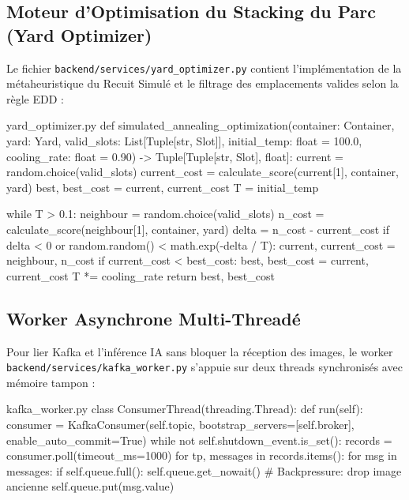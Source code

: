 \documentclass[12pt,a4paper]{article}
\begin{document}
\subsection{Moteur d'Optimisation du Stacking du Parc (Yard Optimizer)}

Le fichier \texttt{backend/services/yard\_optimizer.py} contient l’implémentation de la métaheuristique du Recuit Simulé et le filtrage des emplacements valides selon la règle EDD :

\begin{vscodeWindow}{yard\_optimizer.py}
def simulated_annealing_optimization(container: Container, yard: Yard, valid_slots: List[Tuple[str, Slot]], 
                                     initial_temp: float = 100.0, cooling_rate: float = 0.90) -> Tuple[Tuple[str, Slot], float]:
    current = random.choice(valid_slots)
    current_cost = calculate_score(current[1], container, yard)
    best, best_cost = current, current_cost
    T = initial_temp
    
    while T > 0.1:
        neighbour = random.choice(valid_slots)
        n_cost = calculate_score(neighbour[1], container, yard)
        delta = n_cost - current_cost
        if delta < 0 or random.random() < math.exp(-delta / T):
            current, current_cost = neighbour, n_cost
            if current_cost < best_cost:
                best, best_cost = current, current_cost
        T *= cooling_rate
    return best, best_cost
\end{vscodeWindow}

\subsection{Worker Asynchrone Multi-Threadé}

Pour lier Kafka et l'inférence IA sans bloquer la réception des images, le worker \texttt{backend/services/kafka\_worker.py} s'appuie sur deux threads synchronisés avec mémoire tampon :

\begin{vscodeWindow}{kafka\_worker.py}
class ConsumerThread(threading.Thread):
    def run(self):
        consumer = KafkaConsumer(self.topic, bootstrap_servers=[self.broker], enable_auto_commit=True)
        while not self.shutdown_event.is_set():
            records = consumer.poll(timeout_ms=1000)
            for tp, messages in records.items():
                for msg in messages:
                    if self.queue.full():
                        self.queue.get_nowait() # Backpressure: drop image ancienne
                    self.queue.put(msg.value)
\end{vscodeWindow}
\end{document}
